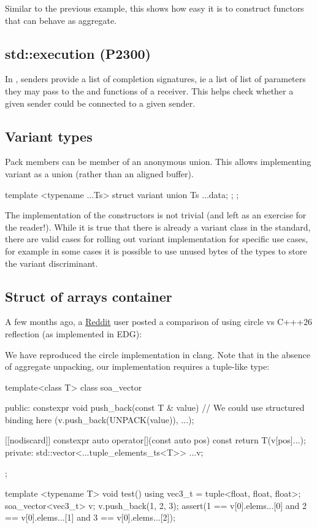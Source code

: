 \documentclass{wg21}
\begin{document}
Similar to the previous example, this shows how easy it is to
construct functors that can behave as aggregate.


\subsection{std::execution (P2300)}

In , senders provide a list of completion signatures, ie a list of list of parameters they may pass
to the  and  functions of a receiver.
This helps check whether a given sender could be connected to a given sender.


\subsection{Variant types}

Pack members can be member of an anonymous union.
This allows implementing variant as a union (rather than an aligned buffer).

\begin{colorblock}
template <typename ...Ts>
struct variant {
    union {
        Ts ...data;
    };
};
\end{colorblock}

The implementation of the constructors is not trivial (and left as an exercise for the reader!).
While it is true that there is already a variant class in the standard, there are valid cases for rolling out
variant implementation for specific use cases, for example in some cases it is possible to use unused bytes of the
types to store the variant discriminant.

\subsection{Struct of arrays container}

A few months ago, a \href{https://www.reddit.com/r/cpp/comments/19aidho/circlelang_vs_c26_soa_vector/}{Reddit} user posted a comparison of using circle vs C+++26 reflection (as implemented in EDG):

We have reproduced the circle implementation in clang. Note that in the absence of aggregate unpacking,
our implementation requires a tuple-like type:

\begin{colorblock}
template<class T>
class soa_vector {
    public:
    constexpr void push_back(const T & value) {
        // We could use structured binding here
        (v.push_back(UNPACK(value)), ...);
    }

    [[nodiscard]] constexpr auto operator[](const auto pos) const {
        return T(v[pos]...);
    }
    private:
    std::vector<...tuple_elements_ts<T>> ...v;
};

template <typename T>
void test() {
    using vec3_t = tuple<float, float, float>;
    soa_vector<vec3_t> v{};
    v.push_back({1, 2, 3});
    assert(1 == v[0].elems...[0] and 2 == v[0].elems...[1] and 3 == v[0].elems...[2]);
}
\end{colorblock}
\end{document}
